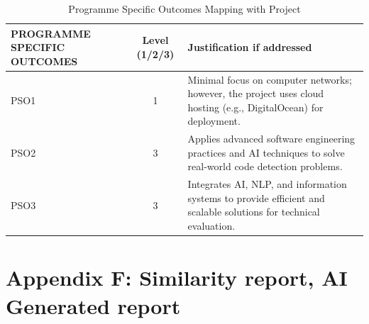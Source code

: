 \begin{table}[h!]
	\centering
	\renewcommand{\arraystretch}{1.3} %
	\setlength{\tabcolsep}{6pt}       %
	\begin{tabular}{|p{3cm}|c|p{8cm}|}
		\hline
		\textbf{PROGRAMME SPECIFIC OUTCOMES} & \textbf{Level (1/2/3)} & \textbf{Justification if addressed} \\
		\hline
		PSO1 & 1 & Minimal focus on computer networks; however, the project uses cloud hosting (e.g., DigitalOcean) for deployment. \\
		\hline
		PSO2 & 3 & Applies advanced software engineering practices and AI techniques to solve real-world code detection problems. \\
		\hline
		PSO3 & 3 & Integrates AI, NLP, and information systems to provide efficient and scalable solutions for technical evaluation. \\
		\hline
	\end{tabular}
	\caption{Programme Specific Outcomes Mapping with Project}
\end{table}
\clearpage

\section {Appendix F: Similarity report, AI Generated report}
\clearpage


